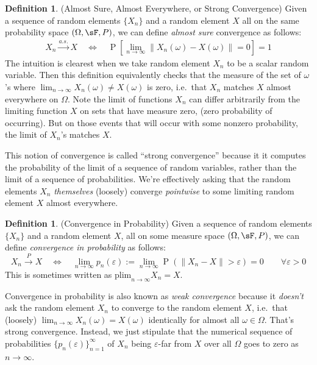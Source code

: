 \documentclass[12pt]{article}
\theoremstyle{plain}
\theoremstyle{definition}
\newtheorem{defn}[thm]{Definition}
\theoremstyle{remark}
\newcommand{\Prb}{\operatorname{P}}
\newcommand{\asto}{\xrightarrow{a.s.}}
\newcommand{\pto}{\xrightarrow{P}}
\newcommand{\plim}{\text{plim}_{n\rightarrow\infty}}
\newcommand{\ninf}{_{n=1}^\infty}
\newcommand{\limn}{\lim_{n\rightarrow\infty}}
\begin{document}
\begin{defn}{(Almost Sure, Almost Everywhere, or Strong Convergence)}
Given a sequence of random elements $\{X_n\}$ and a random element $X$
all on the same probability space $(\Omega,\sF,P)$, we can define
\emph{almost sure} convergence as follows:
\begin{align*}
  X_n\asto X
  \quad \iff \quad
  \Prb\left[\limn \lVert X_n(\omega) - X(\omega)\rVert = 0\right]
  = 1
\end{align*}
The intuition is clearest when we take random element $X_n$ to be a
scalar random variable.
Then this definition equivalently checks that the measure of the set of
$\omega$'s where $\limn X_n(\omega)\neq X(\omega)$ is zero, i.e.\ that
$X_n$ matches $X$ almost everywhere on $\Omega$.
Note the limit of functions $X_n$ can differ arbitrarily from the
limiting function $X$ on sets that have measure zero,
(zero probability of occurring). But on those events that will occur
with some nonzero probability, the limit of $X_n$'s matches $X$.

This notion of convergence is called ``strong convergence'' because it
it computes the probability of the limit of a sequence of random
variables, rather than the limit of a sequence of probabilities. We're
effectively asking that the random elements $X_n$ \emph{themselves}
(loosely) converge \emph{pointwise} to some limiting random element $X$
almost everywhere.
\end{defn}


\begin{defn}{(Convergence in Probability)}
Given a sequence of random elements $\{X_n\}$ and a random element $X$,
all on some measure space $(\Omega,\sF,P)$, we can define
\emph{convergence in probability} as follows:
\begin{equation}
  \label{plim}
  X_n\pto X
  \quad\iff\quad
  \limn p_n(\varepsilon) :=
  \limn
  \Prb\left(\lVert X_n - X \rVert > \varepsilon\right) = 0
  \qquad \forall  \varepsilon> 0
\end{equation}
This is sometimes written as $\plim X_n = X$.

Convergence in probability is also known as \emph{weak convergence}
because it \emph{doesn't} ask the random element $X_n$ to converge to
the random element $X$, i.e.\ that (loosely)
$\limn X_n(\omega)=X(\omega)$ identically for almost all
$\omega\in\Omega$.
That's strong convergence.
Instead, we just stipulate that the numerical sequence of probabilities
$\{p_n(\varepsilon)\}\ninf$ of $X_n$ being $\varepsilon$-far from $X$
over all $\Omega$ goes to zero as $n\rightarrow\infty$.
\end{defn}
\end{document}
